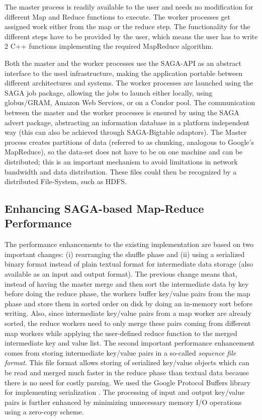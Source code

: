 \documentclass[3p,twocolumn]{elsarticle}
\begin{document}
The master process is readily available to the user and needs no
modification for different Map and Reduce functions to execute.  The
worker processes get assigned work either from the map or the reduce
step. The functionality for the different steps have to be provided by
the user, which means the user has to write 2 C++ functions
implementing the required MapReduce algorithm.

Both the master and the worker processes use the SAGA-API as an
abstract interface to the used infrastructure, making the application
portable between different architectures and systems. The worker
processes are launched using the SAGA job package, allowing the jobs
to launch either locally, using globus/GRAM, Amazon Web Services, or
on a Condor pool. The communication between the master and the worker
processes is ensured by using the SAGA advert package, abstracting an
information database in a platform independent way (this can also be
achieved through SAGA-Bigtable adaptors).  The Master process creates
partitions of data (referred to as chunking, analogous to Google's
MapReduce), so the data-set does not have to be on one machine and can
be distributed; this is an important mechanism to avoid limitations in
network bandwidth and data distribution.  These files could then be
recognized by a distributed File-System, such as HDFS.

\subsection{Enhancing SAGA-based Map-Reduce Performance}


The performance enhancements to the existing \sagamapreduce implementation
are based on two important changes: (i) rearranging the shuffle phase and (ii)
using a serialized binary format instead of plain textual format for intermediate
data storage (also available as an input and output format).  The previous
change means that, instead of having the master merge and then sort the
intermediate data by key before doing the reduce phase, the workers buffer
key/value pairs from the map phase and store them in sorted order
on disk by doing an in-memory sort before writing. Also, since intermediate
key/value pairs from a map worker are already sorted, the reduce workers need
to only merge these pairs coming from different map workers while applying the
user-defined reduce function to the merged intermediate key and value list.
The second important performance enhancement comes from storing intermediate
key/value pairs in a so-called \emph{sequence file format}. This file format
allows storing of serialized key/value objects which can be read and merged
much faster in the reduce phase than textual data because there is no need for
costly parsing.  We used the Google Protocol Buffers library for implementing
serialization \cite{protobuf}.
The processing of input and output key/value pairs is further enhanced by
minimizing unnecessary memory I/O operations using a zero-copy scheme.
\end{document}
